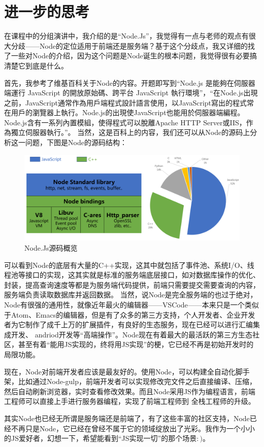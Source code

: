 \documentclass{article}
\begin{document}
\section{进一步的思考}
在课程中的分组演讲中，我介绍的是“Node.Js”，我觉得有一点与老师的观点有很大分歧——Node的定位适用于前端还是服务端？基于这个分歧点，我又详细的找了一些对Node的介绍，因为这个问题是Node诞生的根本问题，我觉得很有必要搞清楚它到底是什么。\par
首先，我参考了维基百科关于Node的内容。开题即写到“Node.js 是能夠在伺服器端運行 JavaScript 的開放原始碼、跨平台 JavaScript 執行環境”，“在Node.js出現之前，JavaScript通常作為用戶端程式設計語言使用，以JavaScript寫出的程式常在用戶的瀏覽器上執行。Node.js的出現使JavaScript也能用於伺服器端編程。Node.js含有一系列內置模組，使得程式可以脫離Apache HTTP Server或IIS，作為獨立伺服器執行。”。
当然，这是百科上的内容，我们还可以从Node的源码上分析这一问题，下图是Node的源码结构：
\begin{figure}[ht]
\centering
\includegraphics[scale=0.15]{nodecode.png}
\caption{Node.Js源码概览}
\label{fig:label}
\end{figure}
可以看到Node的底层有大量的C++实现，这其中就包括了事件池、系统I/O、线程池等接口的实现，这其实就是标准的服务端底层接口，如对数据库操作的优化、封装，提高查询速度等都是为服务端代码提供，前端只需要提交需要查询的内容，服务端负责读取数据库并返回数据。
当然，说Node是完全服务端的也过于绝对，Node有很强的通用性，就像近年最火的编辑器——VSCode——本来只是一个类似于Atom、Emacs的编辑器，但是有了众多的第三方支持，个人开发者、企业开发者为它制作了成千上万的扩展插件，有良好的生态服务，现在已经可以进行汇编集成开发、
andriod开发等“高端操作”。Node现在有着最大的最活跃的第三方生态社区，甚至有着“能用JS实现的，终将用JS实现”的梗，它已经不再是初始开发时的局限功能。\par
现在，Node对前端开发者应该是最友好的。使用Node，可以构建全自动化脚手架，比如通过Node-gulp，前端开发者可以实现修改完文件之后直接编译、压缩，然后自动刷新浏览器，实时查看修改效果。而且Node采用JS作为编程语言，前端工程师可以直接上手进行服务器编程，实现了前端工程师到
全栈工程师的升级。\par
其实Node也已经无所谓是服务端还是前端了，有了这些丰富的社区支持，Node已经不再只是Node，它已经在曾经不属于它的领域绽放出了光彩。我作为一个小小的JS爱好者，幻想一下，希望能看到“JS实现一切”的那个场景$:)$。
\end{document}
